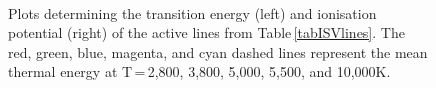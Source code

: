 \begin{figure}[!h]
    \centering
	\captionsetup{width=.8\textwidth}
    \\
    \caption{Plots determining the transition energy (left) and ionisation potential (right) of the active lines from Table\,\ref{tabISVlines}. The red, green, blue, magenta, and cyan dashed lines represent the mean thermal energy at T\,=\,2,800, 3,800, 5,000, 5,500, and 10,000K.}
    \label{figLineTransIon}
\end{figure}

